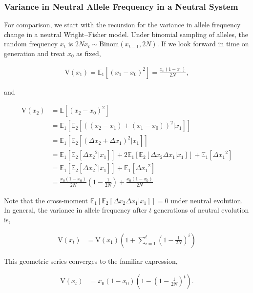 \documentclass[11pt]{article}
\newcommand{\E}{\mathbb{E}}
\newcommand{\V}{\text{V}}
\begin{document}
\subsubsection*{Variance in Neutral Allele Frequency in a Neutral System}

For comparison, we start with the recursion for the variance in allele
frequency change in a neutral Wright--Fisher model. Under binomial sampling of
alleles, the random frequency $x_t$ is $2N x_t \sim \mathrm{Binom}(x_{t-1},
2N)$. If we look forward in time on generation and treat $x_0$ as fixed,

\begin{align}
  \V(x_1) = \E_1\left[(x_1 - x_0)^2\right]= \frac{x_0(1-x_0)}{2N},
\end{align}

and

\begin{align}
  \V(x_2) &= \E\left[(x_2 - x_0)^2\right] \\
          &= \E_1\left[\E_2\left[((x_2-x_1) + (x_1 - x_0))^2 | x_1\right]\right] \\
          &= \E_1\left[\E_2\left[(\Delta x_2 + \Delta x_1)^2 | x_1\right]\right] \\
          &= \E_1\left[\E_2\left[{\Delta x_2}^2|x_1\right]\right] + 2\E_1\left[\E_2[\Delta x_2 \Delta x_1 | x_1]\right] + \E_1\left[ {\Delta x_1}^2\right] \\
          &= \E_1\left[\E_2\left[{\Delta x_2}^2|x_1\right]\right] + \E_1\left[ {\Delta x_1}^2\right] \\
          &= \frac{x_0(1-x_0)}{2N}\left(1 - \frac{1}{2N}\right) + \frac{x_0(1-x_0)}{2N}
\end{align}

Note that the cross-moment $\E_1\left[\E_2[\Delta x_2 \Delta x_1 | x_1]\right]
= 0$ under neutral evolution. In general, the variance in allele frequency
after $t$ generations of neutral evolution is,

\begin{align}
  \label{eq:var_freq}
  \V(x_t) &= \V(x_1) \left(1 + \sum_{i=1}^t \left(1 - \frac{1}{2N}\right)^{i} \right)
\end{align}

This geometric series converges to the familiar expression,

\begin{align}
  \V(x_t) &= x_0(1-x_0)\left(1 - \left(1 - \frac{1}{2N}\right)^t \right).
\end{align}
\end{document}
